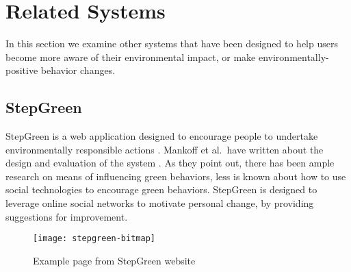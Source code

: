 \section{Related Systems}
\label{sec:related-systems}

In this section we examine other systems that have been designed to help users become more aware of their environmental impact, or make environmentally-positive behavior changes.


\subsection{StepGreen}
\label{sec:stepgreen}

StepGreen is a web application designed to encourage people to undertake environmentally responsible actions \cite{step-green-website}. Mankoff et al.\ have written about the design and evaluation of the system \cite{Mankoff2010}. As they point out, there has been ample research on means of influencing green behaviors, less is known about how to use social technologies to encourage green behaviors. StepGreen is designed to leverage online social networks to motivate personal change, by providing suggestions for improvement.

\begin{figure}[htbp]
	\centering
		\texttt{[image: stepgreen-bitmap]}
		\caption{Example page from StepGreen website}
		\label{fig:stepgreen-website}
\end{figure}

